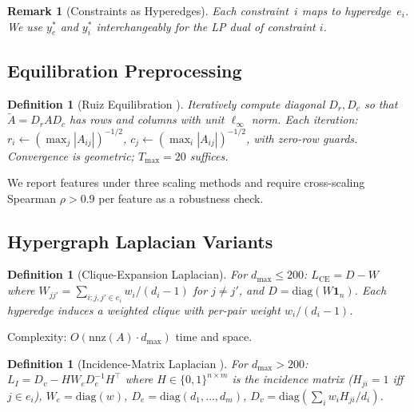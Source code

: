 \documentclass[12pt]{article}
\newtheorem{definition}[theorem]{Definition}
\newtheorem{remark}[theorem]{Remark}
\begin{document}
\begin{remark}[Constraints as Hyperedges]
Each constraint~$i$ maps to hyperedge~$e_i$.  We use $y_e^*$ and $y_i^*$
interchangeably for the LP dual of constraint $i$.
\end{remark}

\subsection{Equilibration Preprocessing}
\label{sec:equilibration}

\begin{definition}[Ruiz Equilibration \citep{ruiz2001scaling}]
\label{def:ruiz}
Iteratively compute diagonal $D_r, D_c$ so that $\tilde{A} = D_r A D_c$
has rows and columns with unit $\ell_\infty$ norm.  Each iteration:
$r_i \leftarrow (\max_j |A_{ij}|)^{-1/2}$,
$c_j \leftarrow (\max_i |A_{ij}|)^{-1/2}$,
with zero-row guards.  Convergence is geometric; $T_{\max} = 20$ suffices.
\end{definition}

We report features under three scaling methods and require cross-scaling
Spearman $\rho > 0.9$ per feature as a robustness check.

\subsection{Hypergraph Laplacian Variants}
\label{sec:laplacian}

\begin{definition}[Clique-Expansion Laplacian]
\label{def:clique-laplacian}
For $d_{\max} \leq 200$: $L_{\mathrm{CE}} = D - W$ where
$W_{jj'} = \sum_{i: j,j' \in e_i} w_i/(d_i - 1)$ for $j \neq j'$, and
$D = \mathrm{diag}(W \mathbf{1}_n)$.  Each hyperedge induces a weighted clique
with per-pair weight $w_i/(d_i-1)$.
\end{definition}

Complexity: $O(\mathrm{nnz}(A) \cdot d_{\max})$ time and space.

\begin{definition}[Incidence-Matrix Laplacian \citep{bolla1993spectra,zhou2006learning}]
\label{def:incidence-laplacian}
For $d_{\max} > 200$: $L_I = D_v - H W_e D_e^{-1} H^\top$ where
$H \in \{0,1\}^{n \times m}$ is the incidence matrix ($H_{ji} = 1$ iff $j \in e_i$),
$W_e = \mathrm{diag}(w)$, $D_e = \mathrm{diag}(d_1,\ldots,d_m)$,
$D_v = \mathrm{diag}(\sum_i w_i H_{ji}/d_i)$.
\end{definition}
\end{document}

